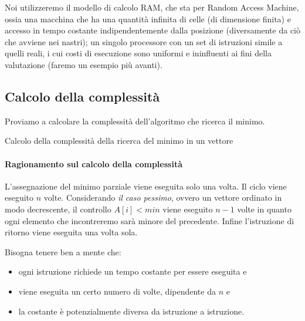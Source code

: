 Noi utilizzeremo il modello di calcolo RAM, che sta per Random Access Machine, ossia una macchina che ha una quantità infinita di celle (di dimensione finita) e accesso in tempo costante indipendentemente dalla posizione (diversamente da ciò che avviene nei nastri); un singolo processore con un set di istruzioni simile a quelli reali, i cui costi di esecuzione sono uniformi e ininfluenti ai fini della valutazione (faremo un esempio più avanti).

\subsection{Calcolo della complessità}

Proviamo a calcolare la complessità dell'algoritmo che ricerca il minimo.

\begin{algorithm}[H]
\caption*{Calcolo della complessità della ricerca del minimo in un vettore}

\BlankLine
\end{algorithm}

\vspace{-15pt}%
\paragraph{Ragionamento sul calcolo della complessità}
L'assegnazione del minimo parziale viene eseguita solo una volta.
Il ciclo viene eseguito \(n\) volte.
Considerando \emph{il caso pessimo}, ovvero un vettore ordinato in modo decrescente, il controllo \(A[i] < min\) viene eseguito \(n-1\) volte in quanto ogni elemento che incontreremo sarà minore del precedente.
Infine l'istruzione di ritorno viene eseguita una volta sola.

Bisogna tenere ben a mente che:
\begin{itemize}
	\item ogni istruzione richiede un tempo costante per essere eseguita e
	\item viene eseguita un certo numero di volte, dipendente da \(n\) e
	\item la costante è potenzialmente diversa da istruzione a istruzione.
\end{itemize}

